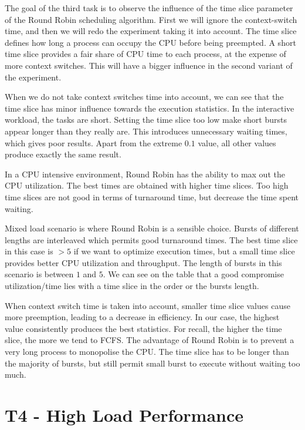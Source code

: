 \documentclass[11pt,a4paper]{scrartcl}
\begin{document}
The goal of the third task is to observe the influence of the time slice parameter of the Round Robin scheduling algorithm. First we will ignore the context-switch time, and then we will redo the experiment taking it into account. The time slice defines how long a process can occupy the CPU before being preempted. A short time slice provides a fair share of CPU time to each process, at the expense of more context switches. This will have a bigger influence in the second variant of the experiment.

When we do not take context switches time into account, we can see that the time slice has minor influence towards the execution statistics. In the interactive workload, the tasks are short. Setting the time slice too low make short bursts appear longer than they really are. This introduces unnecessary waiting times, which gives poor results. Apart from the extreme $0.1$ value, all other values produce exactly the same result.

In a CPU intensive environment, Round Robin has the ability to max out the CPU utilization. The best times are obtained with higher time slices. Too high time slices are not good in terms of turnaround time, but decrease the time spent waiting.

Mixed load scenario is where Round Robin is a sensible choice. Bursts of different lengths are interleaved which permits good turnaround times. The best time slice in this case is $>5$ if we want to optimize execution times, but a small time slice provides better CPU utilization and throughput. The length of bursts in this scenario is between $1$ and $5$. We can see on the table that a good compromise utilization/time lies with a time slice in the order or the bursts length.

When context switch time is taken into account, smaller time slice values cause more preemption, leading to a decrease in efficiency. In our case, the highest value consistently produces the best statistics. For recall, the higher the time slice, the more we tend to FCFS. The advantage of Round Robin is to prevent a very long process to monopolise the CPU. The time slice has to be longer than the majority of bursts, but still permit small burst to execute without waiting too much.



\section*{T4 - High Load Performance}
\end{document}
